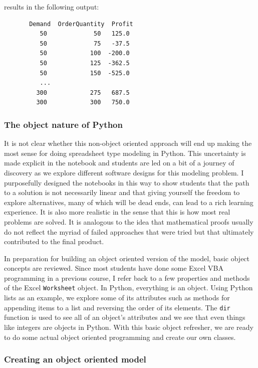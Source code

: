 \documentclass[ited,blindrev]{informs3}              %
\newcommand{\code}[1]{\texttt{#1}}
\begin{document}
results in the following output:


\begin{tcolorbox}
	\begin{verbatim}
	   Demand  OrderQuantity  Profit
	      50             50   125.0
	      50             75   -37.5
	      50            100  -200.0
	      50            125  -362.5
	      50            150  -525.0
	      ...
	     300            275   687.5
	     300            300   750.0
\end{verbatim}	
\end{tcolorbox}

\subsubsection{The object nature of Python}

It is not clear whether this non-object oriented approach will end up making the most sense for doing spreadsheet type modeling in Python. This uncertainty is made explicit in the notebook and students are led on a bit of a journey of discovery as we explore different software designs for this modeling problem. I purposefully designed the notebooks in this way to show students that the path to a solution is not necessarily linear and that giving yourself the freedom to explore alternatives, many of which will be dead ends, can lead to a rich learning experience. It is also more realistic in the sense that this is how most real problems are solved. It is analogous to the idea that mathematical proofs usually do not reflect the myriad of failed approaches that were tried but that ultimately contributed to the final product.

In preparation for building an object oriented version of the model, basic object concepts are reviewed. Since most students have done some Excel VBA programming in a previous course, I refer back to a few properties and methods of the Excel \code{Worksheet} object. In Python, everything is an object. Using Python lists as an example, we explore some of its attributes such as methods for appending items to a list and reversing the order of its elements. The \code{dir} function is used to see all of an object's attributes and we see that even things like integers are objects in Python. With this basic object refresher, we are ready to do some actual object oriented programming and create our own classes.

\subsubsection{Creating an object oriented model}
\end{document}
